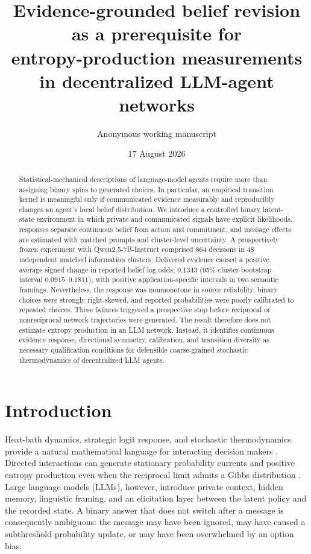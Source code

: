 \documentclass[12pt]{article}
\title{Evidence-grounded belief revision as a prerequisite for\\
entropy-production measurements in decentralized LLM-agent networks}
\author{Anonymous working manuscript}
\date{17 August 2026}
\begin{document}
\maketitle

\begin{abstract}
Statistical-mechanical descriptions of language-model agents require more than
assigning binary spins to generated choices.  In particular, an empirical
transition kernel is meaningful only if communicated evidence measurably and
reproducibly changes an agent's local belief distribution.  We introduce a
controlled binary latent-state environment in which private and communicated
signals have explicit likelihoods, responses separate continuous belief from
action and commitment, and message effects are estimated with matched prompts
and cluster-level uncertainty.  A prospectively frozen experiment with
Qwen2.5-7B-Instruct comprised 864 decisions in 48 independent matched
information clusters.  Delivered evidence caused a positive average signed
change in reported belief log odds, $0.1343$ (95\% cluster-bootstrap interval
$0.0915$--$0.1811$), with positive application-specific intervals in two
semantic framings.  Nevertheless, the response was nonmonotone in source
reliability, binary choices were strongly right-skewed, and reported
probabilities were poorly calibrated to repeated choices.  These failures
triggered a prospective stop before reciprocal or nonreciprocal network
trajectories were generated.  The result therefore does not estimate entropy
production in an LLM network.  Instead, it identifies continuous evidence
response, directional symmetry, calibration, and transition diversity as
necessary qualification conditions for defensible coarse-grained stochastic
thermodynamics of decentralized LLM agents.
\end{abstract}

\section{Introduction}

Heat-bath dynamics, strategic logit response, and stochastic thermodynamics
provide a natural mathematical language for interacting decision makers
\cite{glauber1963,blume1993,seifert2012}.  Directed interactions can generate
stationary probability currents and positive entropy production even when the
reciprocal limit admits a Gibbs distribution
\cite{schnakenberg1976,zhang2023,dicarlo2025}.  Large language models (LLMs),
however, introduce private context, hidden memory, linguistic framing, and an
elicitation layer between the latent policy and the recorded state.  A binary
answer that does not switch after a message is consequently ambiguous: the
message may have been ignored, may have caused a subthreshold probability
update, or may have been overwhelmed by an option bias.
\end{document}
